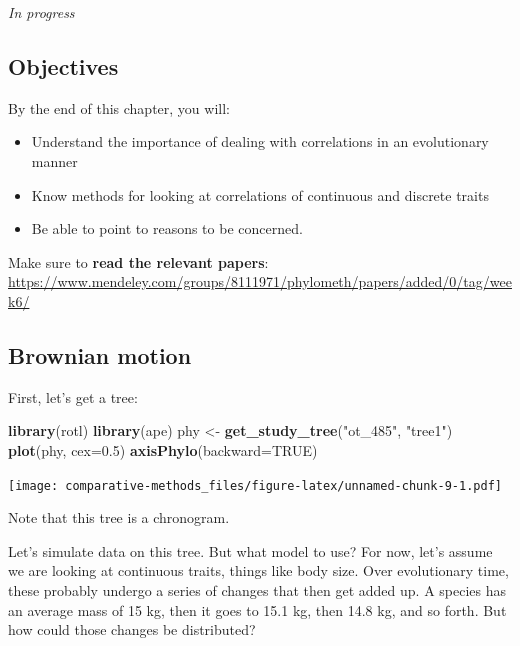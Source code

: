 \documentclass[]{article}
\newenvironment{Shaded}{\begin{snugshade}}{\end{snugshade}}
\newcommand{\DataTypeTok}[1]{\textcolor[rgb]{0.13,0.29,0.53}{#1}}
\newcommand{\FloatTok}[1]{\textcolor[rgb]{0.00,0.00,0.81}{#1}}
\newcommand{\KeywordTok}[1]{\textcolor[rgb]{0.13,0.29,0.53}{\textbf{#1}}}
\newcommand{\NormalTok}[1]{#1}
\newcommand{\OtherTok}[1]{\textcolor[rgb]{0.56,0.35,0.01}{#1}}
\newcommand{\StringTok}[1]{\textcolor[rgb]{0.31,0.60,0.02}{#1}}
\providecommand{\tightlist}{%
  \setlength{\itemsep}{0pt}\setlength{\parskip}{0pt}}
\theoremstyle{definition}
\theoremstyle{definition}
\theoremstyle{definition}
\theoremstyle{remark}
\begin{document}
\emph{In progress}

\hypertarget{objectives-3}{%
\subsection{Objectives}\label{objectives-3}}

By the end of this chapter, you will:

\begin{itemize}
\tightlist
\item
  Understand the importance of dealing with correlations in an
  evolutionary manner
\item
  Know methods for looking at correlations of continuous and discrete
  traits
\item
  Be able to point to reasons to be concerned.
\end{itemize}

Make sure to \textbf{read the relevant papers}:
\url{https://www.mendeley.com/groups/8111971/phylometh/papers/added/0/tag/week6/}

\hypertarget{brownian-motion}{%
\subsection{Brownian motion}\label{brownian-motion}}

First, let's get a tree:

\begin{Shaded}
\begin{Highlighting}[]
\KeywordTok{library}\NormalTok{(rotl)}
\KeywordTok{library}\NormalTok{(ape)}
\NormalTok{phy <-}\StringTok{ }\KeywordTok{get_study_tree}\NormalTok{(}\StringTok{"ot_485"}\NormalTok{, }\StringTok{"tree1"}\NormalTok{)}
\KeywordTok{plot}\NormalTok{(phy, }\DataTypeTok{cex=}\FloatTok{0.5}\NormalTok{)}
\KeywordTok{axisPhylo}\NormalTok{(}\DataTypeTok{backward=}\OtherTok{TRUE}\NormalTok{)}
\end{Highlighting}
\end{Shaded}

\texttt{[image: comparative-methods\_files/figure-latex/unnamed-chunk-9-1.pdf]}

Note that this tree is a chronogram.

Let's simulate data on this tree. But what model to use? For now, let's
assume we are looking at continuous traits, things like body size. Over
evolutionary time, these probably undergo a series of changes that then
get added up. A species has an average mass of 15 kg, then it goes to
15.1 kg, then 14.8 kg, and so forth. But how could those changes be
distributed?
\end{document}
